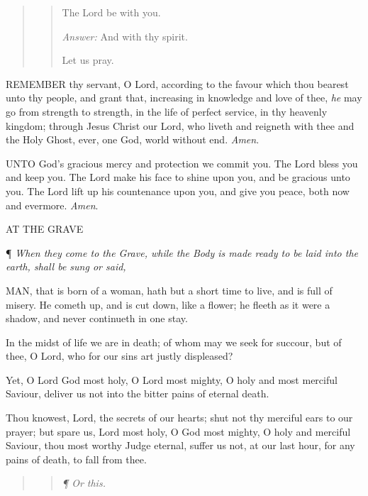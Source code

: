 \begin{quote}

\begin{quote}

The
Lord be with you.

\emph{Answer:} And with
thy spirit.

Let
us pray.

\end{quote}

\end{quote}

REMEMBER
thy servant, O Lord, according to the favour which thou bearest unto thy
people, and grant that, increasing in knowledge and love of thee, \emph{he}
may go from strength to strength, in the life of perfect service, in thy
heavenly kingdom; through Jesus Christ our Lord, who liveth and reigneth
with thee and the Holy Ghost, ever, one God, world without end. \emph{Amen}.

UNTO
God’s gracious mercy and protection we commit you. The Lord bless
you and keep you. The Lord make his face to shine upon you, and be gracious
unto you. The Lord lift up his countenance upon you, and give you peace,
both now and evermore. \emph{Amen}.

\emph{}

AT THE GRAVE

¶
\emph{When they come to the Grave, while the Body is made ready to be
laid into the earth, shall be sung or said,}

MAN,
that is born of a woman, hath but a short time to live, and is full of
misery. He cometh up, and is cut down, like a flower; he fleeth as it
were a shadow, and never continueth in one stay.

In the midst of life we are in death; of whom may we
seek for succour, but of thee, O Lord, who for our sins art justly displeased?

Yet, O Lord God most holy, O Lord most mighty, O holy
and most merciful Saviour, deliver us not into the bitter pains of eternal
death.

Thou knowest, Lord, the secrets of our hearts; shut
not thy merciful ears to our prayer; but spare us, Lord most holy, O God
most mighty, O holy and merciful Saviour, thou most worthy Judge eternal,
suffer us not, at our last hour, for any pains of death, to fall from
thee.

\begin{quote}

\begin{quote}

\emph{¶
Or this.}

\end{quote}

\end{quote}

